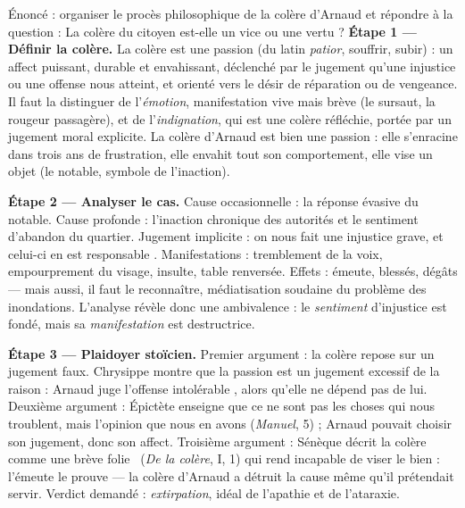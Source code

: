 \documentclass[11pt]{article}
\begin{document}
\begin{exoresolu}
Énoncé : organiser le procès philosophique de la colère d'Arnaud et répondre à la question : \guillemotleft La colère du citoyen est-elle un vice ou une vertu ? \guillemotright
\tcblower
\textbf{Étape 1 — Définir la colère.} La colère est une passion (du latin \emph{patior}, souffrir, subir) : un affect puissant, durable et envahissant, déclenché par le jugement qu'une injustice ou une offense nous atteint, et orienté vers le désir de réparation ou de vengeance. Il faut la distinguer de l'\emph{émotion}, manifestation vive mais brève (le sursaut, la rougeur passagère), et de l'\emph{indignation}, qui est une colère réfléchie, portée par un jugement moral explicite. La colère d'Arnaud est bien une passion : elle s'enracine dans trois ans de frustration, elle envahit tout son comportement, elle vise un objet (le notable, symbole de l'inaction).

\medskip
\textbf{Étape 2 — Analyser le cas.} Cause occasionnelle : la réponse évasive du notable. Cause profonde : l'inaction chronique des autorités et le sentiment d'abandon du quartier. Jugement implicite : \guillemotleft on nous fait une injustice grave, et celui-ci en est responsable \guillemotright. Manifestations : tremblement de la voix, empourprement du visage, insulte, table renversée. Effets : émeute, blessés, dégâts — mais aussi, il faut le reconnaître, médiatisation soudaine du problème des inondations. L'analyse révèle donc une ambivalence : le \emph{sentiment} d'injustice est fondé, mais sa \emph{manifestation} est destructrice.

\medskip
\textbf{Étape 3 — Plaidoyer stoïcien.} Premier argument : la colère repose sur un jugement faux. Chrysippe montre que la passion est un jugement excessif de la raison : Arnaud juge l'offense \guillemotleft intolérable \guillemotright, alors qu'elle ne dépend pas de lui. Deuxième argument : Épictète enseigne que ce ne sont pas les choses qui nous troublent, mais l'opinion que nous en avons (\emph{Manuel}, 5) ; Arnaud pouvait choisir son jugement, donc son affect. Troisième argument : Sénèque décrit la colère comme une \guillemotleft brève folie \guillemotright\ (\emph{De la colère}, I, 1) qui rend incapable de viser le bien : l'émeute le prouve — la colère d'Arnaud a détruit la cause même qu'il prétendait servir. Verdict demandé : \emph{extirpation}, idéal de l'apathie et de l'ataraxie.


\end{exoresolu}
\end{document}
